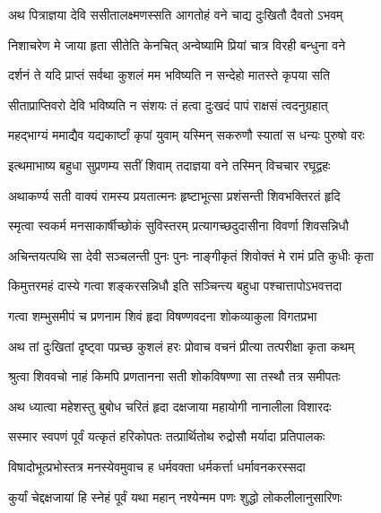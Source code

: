 \twolineshloka
{अथ पित्राज्ञया देवि ससीतालक्ष्मणस्सति}
{आगतोहं वने चाद्य दुःखितौ दैवतो ऽभवम्} %

\twolineshloka
{निशाचरेण मे जाया हृता सीतेति केनचित्}
{अन्वेष्यामि प्रियां चात्र विरही बन्धुना वने} %

\twolineshloka
{दर्शनं ते यदि प्राप्तं सर्वथा कुशलं मम}
{भविष्यति न सन्देहो मातस्ते कृपया सति} %

\twolineshloka
{सीताप्राप्तिवरो देवि भविष्यति न संशयः}
{तं हत्वा दुःखदं पापं राक्षसं त्वदनुग्रहात्} %

\twolineshloka
{महद्भाग्यं ममाद्यैव यद्यकार्ष्टां कृपां युवाम्}
{यस्मिन् सकरुणौ स्यातां स धन्यः पुरुषो वरः} %

\twolineshloka
{इत्थमाभाष्य बहुधा सुप्रणम्य सतीं शिवाम्}
{तदाज्ञया वने तस्मिन् विचचार रघूद्वहः} %

\twolineshloka
{अथाकर्ण्य सती वाक्यं रामस्य प्रयतात्मनः}
{हृष्टाभूत्सा प्रशंसन्ती शिवभक्तिरतं हृदि} %

\twolineshloka
{स्मृत्वा स्वकर्म मनसाकार्षीच्छोकं सुविस्तरम्}
{प्रत्यागच्छदुदासीना विवर्णा शिवसन्निधौ} %

\twolineshloka
{अचिन्तयत्पथि सा देवी सञ्चलन्ती पुनः पुनः}
{नाङ्गीकृतं शिवोक्तं मे रामं प्रति कुधीः कृता} %

\twolineshloka
{किमुत्तरमहं दास्ये गत्वा शङ्करसन्निधौ}
{इति सञ्चिन्त्य बहुधा पश्चात्तापोऽभवत्तदा} %

\twolineshloka
{गत्वा शम्भुसमीपं च प्रणनाम शिवं हृदा}
{विषण्णवदना शोकव्याकुला विगतप्रभा} %

\twolineshloka
{अथ तां दुःखितां दृष्ट्वा पप्रच्छ कुशलं हरः}
{प्रोवाच वचनं प्रीत्या तत्परीक्षा कृता कथम्} %

\twolineshloka
{श्रुत्वा शिववचो नाहं किमपि प्रणतानना}
{सती शोकविषण्णा सा तस्थौ तत्र समीपतः} %

\twolineshloka
{अथ ध्यात्वा महेशस्तु बुबोध चरितं हृदा}
{दक्षजाया महायोगी नानालीला विशारदः} %

\twolineshloka
{सस्मार स्वपणं पूर्वं यत्कृतं हरिकोपतः}
{तत्प्रार्थितोथ रुद्रोसौ मर्यादा प्रतिपालकः} %

\twolineshloka
{विषादोभूत्प्रभोस्तत्र मनस्येवमुवाच ह}
{धर्मवक्ता धर्मकर्त्ता धर्मावनकरस्सदा} %


\twolineshloka
{कुर्यां चेद्दक्षजायां हि स्नेहं पूर्वं यथा महान्}
{नश्येन्मम पणः शुद्धो लोकलीलानुसारिणः} %


